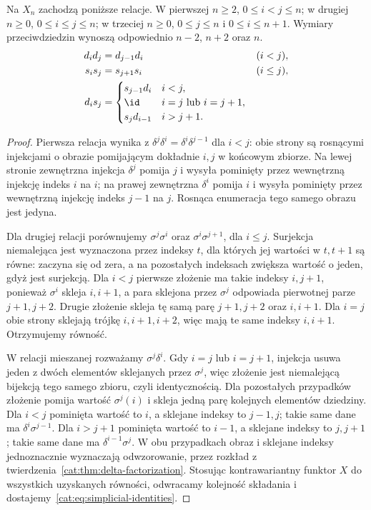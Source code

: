 \begin{stwierdzenie}\label{cat:prop:simplicial-identities}
Na $X_n$ zachodzą poniższe relacje. W pierwszej $n\geq2$, $0\leq i<j\leq n$; w drugiej $n\geq0$, $0\leq i\leq j\leq n$; w trzeciej $n\geq0$, $0\leq j\leq n$ i $0\leq i\leq n+1$. Wymiary przeciwdziedzin wynoszą odpowiednio $n-2$, $n+2$ oraz $n$.
\begin{equation}\label{cat:eq:simplicial-identities}
\begin{aligned}
 d_i d_j&=d_{j-1}d_i &&(i<j),\\
 s_i s_j&=s_{j+1}s_i &&(i\leq j),\\
 d_i s_j&=
 \begin{cases}
 s_{j-1}d_i&i<j,\\
 \id&i=j\ \text{lub}\ i=j+1,\\
 s_j d_{i-1}&i>j+1.
 \end{cases}
\end{aligned}
\end{equation}
\end{stwierdzenie}
\begin{proof}
Pierwsza relacja wynika z $\delta^j\delta^i=\delta^i\delta^{j-1}$ dla $i<j$: obie strony są rosnącymi injekcjami o obrazie pomijającym dokładnie $i,j$ w końcowym zbiorze. Na lewej stronie zewnętrzna injekcja $\delta^j$ pomija $j$ i wysyła pominięty przez wewnętrzną injekcję indeks $i$ na $i$; na prawej zewnętrzna $\delta^i$ pomija $i$ i wysyła pominięty przez wewnętrzną injekcję indeks $j-1$ na $j$. Rosnąca enumeracja tego samego obrazu jest jedyna.

Dla drugiej relacji porównujemy $\sigma^j\sigma^i$ oraz $\sigma^i\sigma^{j+1}$, dla $i\leq j$. Surjekcja niemalejąca jest wyznaczona przez indeksy $t$, dla których jej wartości w $t,t+1$ są równe: zaczyna się od zera, a na pozostałych indeksach zwiększa wartość o jeden, gdyż jest surjekcją. Dla $i<j$ pierwsze złożenie ma takie indeksy $i,j+1$, ponieważ $\sigma^i$ skleja $i,i+1$, a para sklejona przez $\sigma^j$ odpowiada pierwotnej parze $j+1,j+2$. Drugie złożenie skleja tę samą parę $j+1,j+2$ oraz $i,i+1$. Dla $i=j$ obie strony sklejają trójkę $i,i+1,i+2$, więc mają te same indeksy $i,i+1$. Otrzymujemy równość.

W relacji mieszanej rozważamy $\sigma^j\delta^i$. Gdy $i=j$ lub $i=j+1$, injekcja usuwa jeden z dwóch elementów sklejanych przez $\sigma^j$, więc złożenie jest niemalejącą bijekcją tego samego zbioru, czyli identycznością. Dla pozostałych przypadków złożenie pomija wartość $\sigma^j(i)$ i skleja jedną parę kolejnych elementów dziedziny. Dla $i<j$ pominięta wartość to $i$, a sklejane indeksy to $j-1,j$; takie same dane ma $\delta^i\sigma^{j-1}$. Dla $i>j+1$ pominięta wartość to $i-1$, a sklejane indeksy to $j,j+1$; takie same dane ma $\delta^{i-1}\sigma^j$. W obu przypadkach obraz i sklejane indeksy jednoznacznie wyznaczają odwzorowanie, przez rozkład z twierdzenia~\ref{cat:thm:delta-factorization}. Stosując kontrawariantny funktor $X$ do wszystkich uzyskanych równości, odwracamy kolejność składania i dostajemy~\eqref{cat:eq:simplicial-identities}.
\end{proof}


